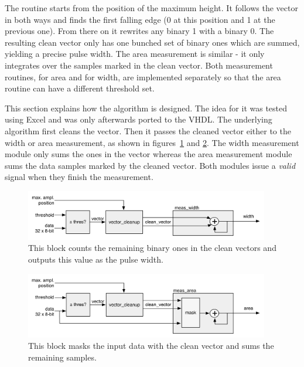 The routine starts from the position of the maximum height. It follows the vector in both ways and finds the first falling edge (0 at this position and 1 at the previous one). From there on it rewrites any binary 1 with a binary 0. The resulting clean vector only has one bunched set of binary ones which are summed, yielding a precise pulse width. The area measurement is similar - it only integrates over the samples marked in the clean vector. Both measurement routines, for area and for width, are implemented separately so that the area routine can have a different threshold set.

This section explains how the algorithm is designed. The idea for it was tested using Excel and was only afterwards ported to the VHDL. The underlying algorithm first cleans the vector. Then it passes the cleaned vector either to the width or area measurement, as shown in figures~\ref{fig:width} and \ref{fig:area}. The width measurement module only sums the ones in the vector whereas the area measurement module sums the data samples marked by the cleaned vector. Both modules issue a \emph{valid} signal when they finish the measurement.

\begin{figure}[!t]
\centering
\includegraphics[width=0.95\textwidth]{05_current_monitoring/plots/width2}
\caption{This block counts the remaining binary ones in the clean vectors and outputs this value as the pulse width.}
\label{fig:width}
\end{figure}


\begin{figure}[!t]
\centering\includegraphics[width=0.95\textwidth]{05_current_monitoring/plots/area2}
\caption{This block masks the input data with the clean vector and sums the remaining samples.}
\label{fig:area}
\end{figure}


